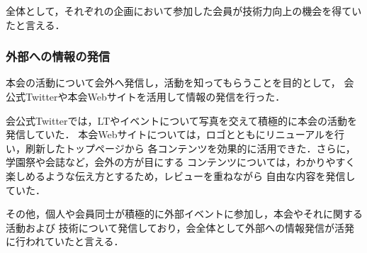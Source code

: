 全体として，それぞれの企画において参加した会員が技術力向上の機会を得ていたと言える．

\subsubsection*{外部への情報の発信}
本会の活動について会外へ発信し，活動を知ってもらうことを目的として，
会公式Twitterや本会Webサイトを活用して情報の発信を行った．

会公式Twitterでは，LTやイベントについて写真を交えて積極的に本会の活動を発信していた．
本会Webサイトについては，ロゴとともにリニューアルを行い，刷新したトップページから
各コンテンツを効果的に活用できた．さらに，学園祭や会誌など，会外の方が目にする
コンテンツについては，わかりやすく楽しめるような伝え方とするため，レビューを重ねながら
自由な内容を発信していた．

その他，個人や会員同士が積極的に外部イベントに参加し，本会やそれに関する活動および
技術について発信しており，会全体として外部への情報発信が活発に行われていたと言える．
